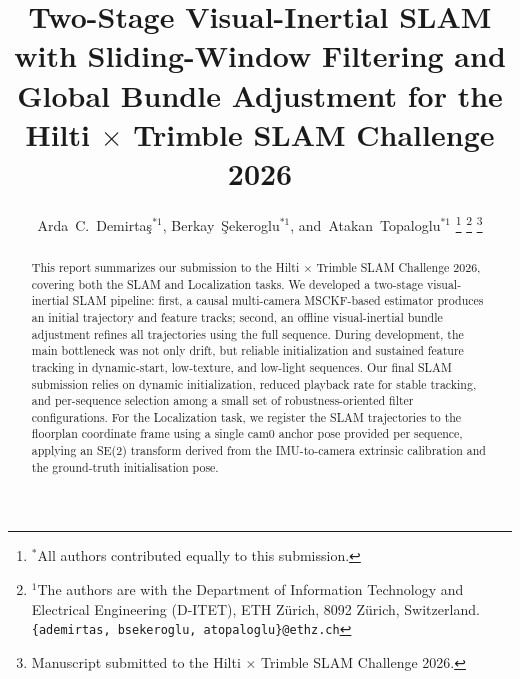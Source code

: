 \documentclass[journal]{IEEEtran}
\begin{document}
\title{Two-Stage Visual-Inertial SLAM with Sliding-Window Filtering and
Global Bundle Adjustment for the Hilti $\times$ Trimble SLAM Challenge 2026}

\author{Arda~C.~Demirta\c{s}$^{*1}$,
        Berkay~\c{S}ekeroglu$^{*1}$,
        and~Atakan~Topaloglu$^{*1}$%
\thanks{$^{*}$All authors contributed equally to this submission.}%
\thanks{$^{1}$The authors are with the Department of Information Technology
  and Electrical Engineering (D-ITET), ETH Z\"urich, 8092 Z\"urich,
  Switzerland. \texttt{\{ademirtas, bsekeroglu, atopaloglu\}@ethz.ch}}%
\thanks{Manuscript submitted to the Hilti $\times$ Trimble
  SLAM Challenge 2026.}}

\maketitle

\begin{abstract}
This report summarizes our submission to the Hilti $\times$ Trimble SLAM Challenge 2026,
covering both the SLAM and Localization tasks.
We developed a two-stage visual-inertial SLAM pipeline: first, a causal
multi-camera MSCKF-based estimator produces an initial trajectory and feature
tracks; second, an offline visual-inertial bundle adjustment refines all
trajectories using the full sequence.
During development, the main bottleneck was not only drift, but reliable
initialization and sustained feature tracking in dynamic-start, low-texture,
and low-light sequences.
Our final SLAM submission relies on dynamic initialization, reduced
playback rate for stable tracking, and per-sequence selection among a small
set of robustness-oriented filter configurations.
For the Localization task, we register the SLAM trajectories to the floorplan
coordinate frame using a single cam0 anchor pose provided per sequence,
applying an SE(2) transform derived from the IMU-to-camera extrinsic calibration
and the ground-truth initialisation pose.
\end{abstract}
\end{document}
